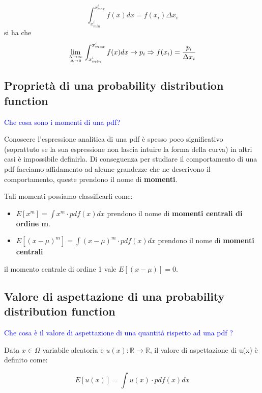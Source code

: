 \documentclass[11pt,a4paper]{book}
\begin{document}
\begin{equation*}
	\int_{x_{min}^i}^{x_{max}^i}f(x) dx = f(x_i)\Delta x_i
\end{equation*}
si ha che 
\begin{equation*}
	\lim_{N \rightarrow \infty \atop \Delta \rightarrow 0} \int_{x_{min}^i}^{x_{max}^i}f(x) dx \rightarrow p_i \Rightarrow f(x_i) =  \dfrac{p_i}{\Delta x_i}
\end{equation*}

\subsection{Propriet\`{a} di una probability distribution function}
\textcolor{blue}{Che cosa sono i momenti di una pdf?}\newline

Conoscere l'espressione analitica di una pdf \`{e} spesso poco significativo (soprattuto se la sua espressione non lascia intuire la forma della curva) in altri casi \`{e} impossibile definirla. Di conseguenza per studiare il comportamento di una pdf facciamo affidamento ad alcune grandezze che ne descrivono il comportamento, queste prendono il nome di \textbf{momenti}.

Tali momenti possiamo classificarli come:

\begin{itemize}
	\item $E[x^m] = \int{x^m\cdot pdf(x)dx}$ prendono il nome di \textbf{momenti centrali di ordine m}.
	\item $E[(x-\mu)^m] = \int{(x-\mu)^m \cdot pdf(x)dx}$ prendono il nome di \textbf{momenti centrali}
\end{itemize}

il momento centrale di ordine 1 vale $E[(x-\mu)] = 0$.
\subsection{Valore di aspettazione di una probability distribution function}

\textcolor{blue}{Che cosa \`{e} il valore di aspettazione di una quantit\`{a} rispetto ad una pdf ?}

Data $x \in  \Omega $ variabile aleatoria e $u(x): \mathbb{R} \rightarrow \mathbb{R}$, il valore di aspettazione di u(x) \`{e} definito come:

\begin{equation}
	E[u(x)] = \int{u(x)\cdot pdf(x)dx}
\end{equation}
\end{document}

